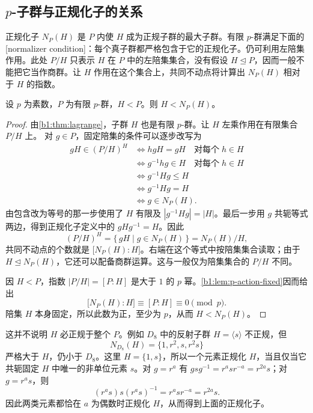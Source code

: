 \subsection{\texorpdfstring{\(p\)}{p}-子群与正规化子的关系}
\label{b1:subsec:0502:03}

正规化子 \(N_P(H)\) 是 \(P\) 内使 \(H\) 成为正规子群的最大子群。有限 \(p\)-群满足下面的[normalizer condition]：每个真子群都严格包含于它的正规化子。仍可利用左陪集作用。此处 \(P/H\) 只表示 \(H\) 在 \(P\) 中的左陪集集合，没有假设 \(H\trianglelefteq P\)，因而一般不能把它当作商群。让 \(H\) 作用在这个集合上，共同不动点将计算出 \(N_P(H)\) 相对于 \(H\) 的指数。

\begin{proposition}[正规化子条件]\label{b1:prop:p-normalizer-condition}
	设 \(p\) 为素数，\(P\) 为有限 \(p\)-群，\(H<P\)。则 \(H<N_P(H)\)。
\end{proposition}

\begin{proof}
	由\cref{b1:thm:lagrange}，子群 \(H\) 也是有限 \(p\)-群。让 \(H\) 左乘作用在有限集合 \(P/H\) 上。 对 \(g\in P\)，固定陪集的条件可以逐步改写为
	\[
		\begin{aligned}
			gH\in(P/H)^H &\Longleftrightarrow hgH=gH\quad\text{对每个}\;h\in H\\
			&\Longleftrightarrow g^{-1}hg\in H\quad\text{对每个}\;h\in H\\
			&\Longleftrightarrow g^{-1}Hg\leq H\\
			&\Longleftrightarrow g^{-1}Hg=H\\
			&\Longleftrightarrow g\in N_P(H).
		\end{aligned}
	\]
	由包含改为等号的那一步使用了 \(H\) 有限及 \(|g^{-1}Hg|=|H|\)。最后一步用 \(g\) 共轭等式两边，得到正规化子定义中的 \(gHg^{-1}=H\)。因此
	\[
		(P/H)^H=\{\,gH\mid g\in N_P(H)\,\}=N_P(H)/H,
	\]
	共同不动点的个数就是 \(\bigl[N_P(H):H\bigr]\)。右端在这个等式中按陪集集合读取；由于 \(H\trianglelefteq N_P(H)\)，它还可以配备商群运算。这与一般仅为陪集集合的 \(P/H\) 不同。

	因 \(H<P\)，指数 \(|P/H|=[P:H]\) 是大于 \(1\) 的 \(p\) 幂。\cref{b1:lem:p-action-fixed}因而给出
	\[
		\bigl[N_P(H):H\bigr]\equiv[P:H]\equiv0\pmod p.
	\]
	陪集 \(H\) 本身固定，所以此数为正，至少为 \(p\)，从而 \(H<N_P(H)\)。
\end{proof}

这并不说明 \(H\) 必正规于整个 \(P\)。例如 \(D_8\) 中的反射子群 \(H=\langle s\rangle\) 不正规，但
\[
	N_{D_8}(H)=\{1,r^2,s,r^2s\}
\]
严格大于 \(H\)，仍小于 \(D_8\)。这里 \(H=\{1,s\}\)，所以一个元素正规化 \(H\)，当且仅当它共轭固定 \(H\) 中唯一的非单位元素 \(s\)。对 \(g=r^a\) 有 \(gsg^{-1}=r^asr^{-a}=r^{2a}s\)；对 \(g=r^as\)，则
\[
	(r^as)s(r^as)^{-1} =r^asr^{-a} =r^{2a}s.
\]
因此两类元素都恰在 \(a\) 为偶数时正规化 \(H\)，从而得到上面的正规化子。

